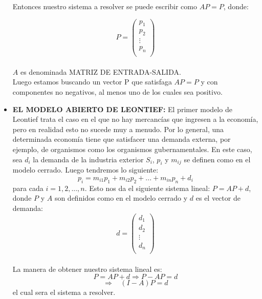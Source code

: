 \documentclass[10pt,a4paper]{article}
\begin{document}
\begin{multicols}{2}
\begin{itemize}
Entonces nuestro sistema a resolver se puede escribir como $AP = P$, donde:
	
 \[ P =
\left( \begin{array}{cccc}
p_{1} \\ 
p_{2} \\ 
\vdots  \\
p_{n} \\ 
\end{array} \right) \]\\
 $A$ es denominada MATRIZ DE ENTRADA-SALIDA.\\
 Luego estamos buscando un vector P que satisfaga $AP = P$ y con componentes no negativos, al menos uno de los cuales sea positivo.\\
 
 \item{\textbf{EL MODELO ABIERTO DE LEONTIEF: }}El primer modelo de Leontief trata el caso en el que no hay mercancías que ingresen a la economía, pero en realidad esto no sucede muy a menudo. Por lo general, una determinada economía tiene que satisfacer una demanda externa, por ejemplo, de organismos como los organismos gubernamentales. En este caso, sea $d_{i}$ la demanda de la industria exterior $S_i$, $p_{i}$ y $m_{ij}$ se definen como en el modelo cerrado. Luego tendremos lo siguiente:
 $$ p_{i} = m_{i1}p_{1} + m_{i2}p_{2} + ... + m_{in}p_{n} + d_{i}$$
 para cada $i=1,2,...,n$. Esto nos da el siguiente sistema lineal:  $P = AP + d$, donde $P$ y $A$ son definidos como en el modelo cerrado y $d$ es el vector de demanda:\\
 	\[ d =
 	\left( \begin{array}{cccc}
 	d_{1} \\
 	d_{2} \\ 
 	\vdots  \\
 	d_{n} \\ 
 	\end{array} \right) \]\\
 	
 La manera de obtener nuestro sistema lineal es:
 	$$ P = AP +d \Rightarrow P-AP = d$$
 	\begin{equation}\label{ecu1}
 		\Rightarrow \ \ \ \ (I-A)P = d
 	\end{equation}
 	el cual sera el sistema a resolver.
 

\end{itemize}
\end{multicols}
\end{document}
